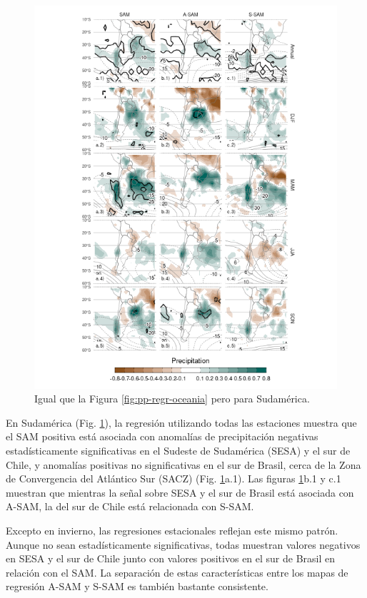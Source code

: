 \documentclass[12pt,oneside]{reedthesis}
\begin{document}
\begin{figure}
\includegraphics{figures/30-sam/pp-regr-america-1} \caption{Igual que la Figura \ref{fig:pp-regr-oceania} pero para Sudamérica.}\label{fig:pp-regr-america}
\end{figure}

En Sudamérica (Fig. \ref{fig:pp-regr-america}), la regresión utilizando todas las estaciones muestra que el SAM positiva está asociada con anomalías de precipitación negativas estadísticamente significativas en el Sudeste de Sudamérica (SESA) y el sur de Chile, y anomalías positivas no significativas en el sur de Brasil, cerca de la Zona de Convergencia del Atlántico Sur (SACZ) (Fig. \ref{fig:pp-regr-america}a.1).
Las figuras \ref{fig:pp-regr-america}b.1 y c.1 muestran que mientras la señal sobre SESA y el sur de Brasil está asociada con A-SAM, la del sur de Chile está relacionada con S-SAM.

Excepto en invierno, las regresiones estacionales reflejan este mismo patrón.
Aunque no sean estadísticamente significativas, todas muestran valores negativos en SESA y el sur de Chile junto con valores positivos en el sur de Brasil en relación con el SAM.
La separación de estas características entre los mapas de regresión A-SAM y S-SAM es también bastante consistente.
\end{document}
